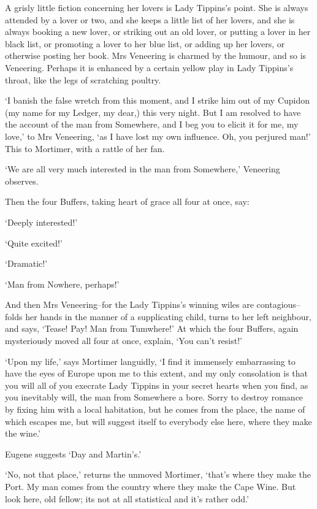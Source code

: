 A grisly little fiction concerning her lovers is Lady Tippins’s point.
She is always attended by a lover or two, and she keeps a little list
of her lovers, and she is always booking a new lover, or striking out an
old lover, or putting a lover in her black list, or promoting a lover to
her blue list, or adding up her lovers, or otherwise posting her book.
Mrs Veneering is charmed by the humour, and so is Veneering. Perhaps it
is enhanced by a certain yellow play in Lady Tippins’s throat, like the
legs of scratching poultry.

‘I banish the false wretch from this moment, and I strike him out of
my Cupidon (my name for my Ledger, my dear,) this very night. But I am
resolved to have the account of the man from Somewhere, and I beg you
to elicit it for me, my love,’ to Mrs Veneering, ‘as I have lost my own
influence. Oh, you perjured man!’ This to Mortimer, with a rattle of her
fan.

‘We are all very much interested in the man from Somewhere,’ Veneering
observes.

Then the four Buffers, taking heart of grace all four at once, say:

‘Deeply interested!’

‘Quite excited!’

‘Dramatic!’

‘Man from Nowhere, perhaps!’

And then Mrs Veneering--for the Lady Tippins’s winning wiles are
contagious--folds her hands in the manner of a supplicating child, turns
to her left neighbour, and says, ‘Tease! Pay! Man from Tumwhere!’ At
which the four Buffers, again mysteriously moved all four at once,
explain, ‘You can’t resist!’

‘Upon my life,’ says Mortimer languidly, ‘I find it immensely
embarrassing to have the eyes of Europe upon me to this extent, and my
only consolation is that you will all of you execrate Lady Tippins in
your secret hearts when you find, as you inevitably will, the man from
Somewhere a bore. Sorry to destroy romance by fixing him with a local
habitation, but he comes from the place, the name of which escapes me,
but will suggest itself to everybody else here, where they make the
wine.’

Eugene suggests ‘Day and Martin’s.’

‘No, not that place,’ returns the unmoved Mortimer, ‘that’s where they
make the Port. My man comes from the country where they make the Cape
Wine. But look here, old fellow; its not at all statistical and it’s
rather odd.’

